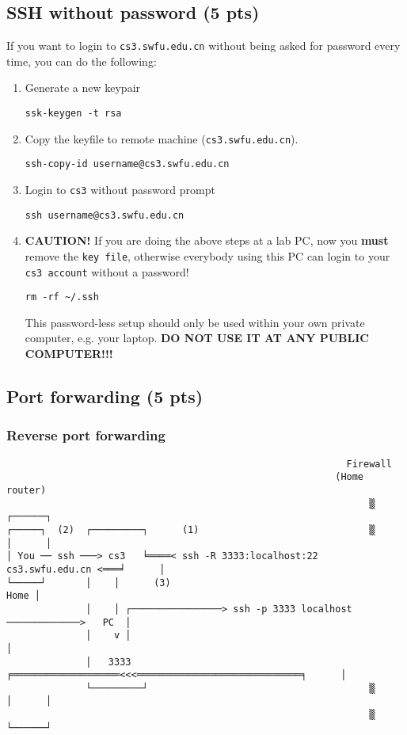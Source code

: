 \documentclass{article} [NO-DEFAULT-PACKAGES] \usepackage{wx672hyperref}
\begin{document}
\subsection{SSH without password (5 pts)}
\label{sec:org44f30ae}
If you want to login to \texttt{cs3.swfu.edu.cn} without being asked for password
every time, you can do the following:
\begin{enumerate}
\item Generate a new keypair
\begin{verbatim}
ssk-keygen -t rsa
\end{verbatim}
\item Copy the keyfile to remote machine (\texttt{cs3.swfu.edu.cn}).
\begin{verbatim}
ssh-copy-id username@cs3.swfu.edu.cn
\end{verbatim}
\item Login to \texttt{cs3} without password prompt
\begin{verbatim}
ssh username@cs3.swfu.edu.cn
\end{verbatim}
\item \textbf{CAUTION!} If you are doing the above steps at a lab PC, now you \textbf{must} remove the \texttt{key
      file}, otherwise everybody using this PC can login to your \texttt{cs3 account} without a
password!
\begin{verbatim}
rm -rf ~/.ssh
\end{verbatim}

This password-less setup should only be used within your own private computer,
e.g. your laptop. \textbf{DO NOT USE IT AT ANY PUBLIC COMPUTER!!!}
\end{enumerate}
\subsection{Port forwarding (5 pts)}
\label{sec:org8d3f909}
\subsubsection{Reverse port forwarding}
\label{sec:org4afcd8b}

\verbatimfont{\tiny\dejavu}
\begin{verbatim}
                                                            Firewall
                                                          (Home router)
                                                                ▒           ┌──────┐
┌─────┐  (2)  ┌─────────┐      (1)                              ▒           │      │
│ You ── ssh ───> cs3   ╘════< ssh -R 3333:localhost:22 cs3.swfu.edu.cn <═══╛      │
└─────┘       │    │      (3)                                                 Home │
              │    │ ┌────────────────> ssh -p 3333 localhost ─────────────>   PC  │
              │    v │                                                             │
              │   3333  ╒═══════════════════<<<═════════════════════════════╕      │
              └─────────┘                                       ▒           │      │
                                                                ▒           └──────┘
\end{verbatim}
\end{document}
